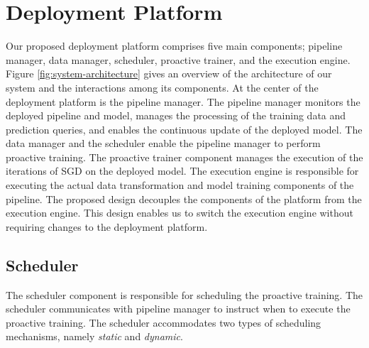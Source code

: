 \section{Deployment Platform} \label{sec:system-architecture}
Our proposed deployment platform comprises five main components; pipeline manager, data manager, scheduler, proactive trainer, and the execution engine.
Figure \ref{fig:system-architecture} gives an overview of the architecture of our system and the interactions among its components.
At the center of the deployment platform is the pipeline manager.
The pipeline manager monitors the deployed pipeline and model, manages the processing of the training data and prediction queries, and enables the continuous update of the deployed model.
The data manager and the scheduler enable the pipeline manager to perform proactive training.
The proactive trainer component manages the execution of the iterations of SGD on the deployed model.
The execution engine is responsible for executing the actual data transformation and model training components of the pipeline.
The proposed design decouples the components of the platform from the execution engine.
This design enables us to switch the execution engine without requiring changes to the deployment platform.

\subsection{Scheduler}\label{scheduler}
The scheduler component is responsible for scheduling the proactive training.
The scheduler communicates with pipeline manager to instruct when to execute the proactive training.
The scheduler accommodates two types of scheduling mechanisms, namely \textit{static} and \textit{dynamic}.

